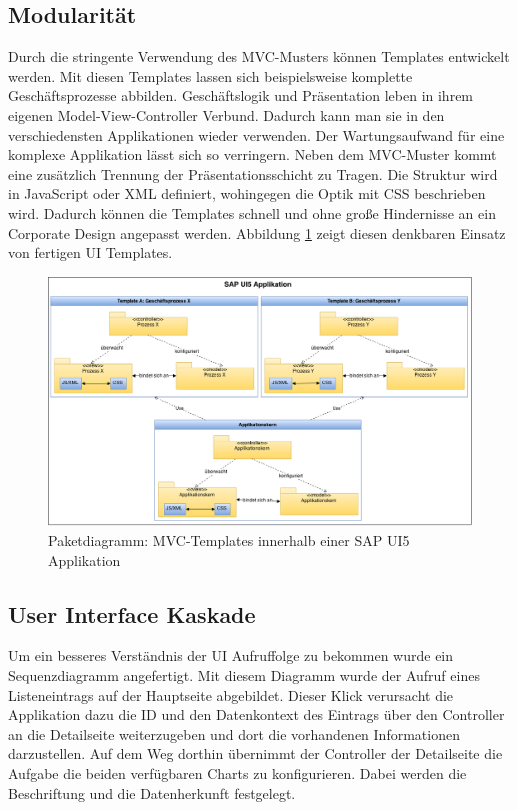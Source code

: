 \newpage
\subsection{Modularität}
Durch die stringente Verwendung des MVC-Musters können Templates entwickelt werden. Mit diesen Templates lassen sich beispielsweise komplette Geschäftsprozesse abbilden. Geschäftslogik und Präsentation leben in ihrem eigenen Model-View-Controller Verbund. Dadurch kann man sie in den verschiedensten Applikationen wieder verwenden. Der Wartungsaufwand für eine komplexe Applikation lässt sich so verringern. Neben dem MVC-Muster kommt eine zusätzlich Trennung der Präsentationsschicht zu Tragen. Die Struktur wird in JavaScript oder XML definiert, wohingegen die Optik mit CSS beschrieben wird. Dadurch können die Templates schnell und ohne große Hindernisse an ein Corporate Design angepasst werden. Abbildung \ref{fig:sapui5mvctemplates} zeigt diesen denkbaren Einsatz von fertigen UI Templates.

\vspace{1em}
\begin{figure}[htb]
  \centering
  \includegraphics[width=1.1\linewidth,angle=90]{abb/sapui5_mvc_templates}
  \caption[Paketdiagramm: MVC-Templates innerhalb einer SAP UI5 Applikation]{Paketdiagramm: MVC-Templates innerhalb einer SAP UI5 Applikation}
  \label{fig:sapui5mvctemplates}
\end{figure}

\newpage
\subsection{User Interface Kaskade}
Um ein besseres Verständnis der UI Aufruffolge zu bekommen wurde ein Sequenzdiagramm angefertigt. Mit diesem Diagramm wurde der Aufruf eines Listeneintrags auf der Hauptseite abgebildet. Dieser Klick verursacht die Applikation dazu die ID und den Datenkontext des Eintrags über den Controller an die Detailseite weiterzugeben und dort die vorhandenen Informationen darzustellen. Auf dem Weg dorthin übernimmt der Controller der Detailseite die Aufgabe die beiden verfügbaren Charts zu konfigurieren. Dabei werden die Beschriftung und die Datenherkunft festgelegt.

